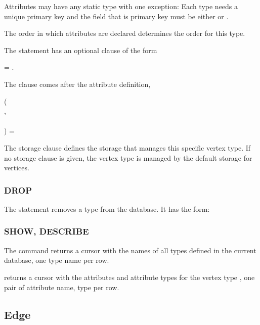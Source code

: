 Attributes may have any static type with one exception:
Each type needs a unique primary key and the field
that is primary key must be either
 or .

The order in which attributes are declared
determines the  order for this type.

The  statement has an optional
 clause of the form

 = .

The  clause comes after the
attribute definition, \eg\

\begin{minipage}{\textwidth}
  ( \\
\hspace*{1cm}  , \\
\hspace*{1cm}  \\
)  = 
\end{minipage}

The storage clause defines the storage
that manages this specific vertex type.
If no storage clause is given, the vertex type
is managed by the default storage for vertices.

\subsubsection{DROP}
The  statement removes a type
from the database.
It has the form:

 

\subsubsection{SHOW, DESCRIBE}
The command 
returns a cursor with the names of all
types defined in the current database,
one type name per row.

 
returns a cursor with the attributes
and attribute types for the vertex type
, one pair of
attribute name, type per row.

\subsection{Edge}

